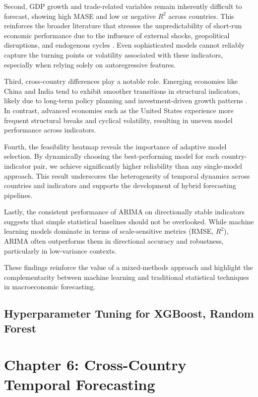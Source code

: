 \documentclass[12pt]{article}
\begin{document}
Second, GDP growth and trade-related variables remain inherently difficult to forecast, showing high MASE and low or negative $R^2$ across countries. This reinforces the broader literature that stresses the unpredictability of short-run economic performance due to the influence of external shocks, geopolitical disruptions, and endogenous cycles \cite{Loungani2001, stock2002structural}. Even sophisticated models cannot reliably capture the turning points or volatility associated with these indicators, especially when relying solely on autoregressive features.

Third, cross-country differences play a notable role. Emerging economies like China and India tend to exhibit smoother transitions in structural indicators, likely due to long-term policy planning and investment-driven growth patterns \cite{zhang2020china, OECD2019india}. In contrast, advanced economies such as the United States experience more frequent structural breaks and cyclical volatility, resulting in uneven model performance across indicators.

Fourth, the feasibility heatmap reveals the importance of adaptive model selection. By dynamically choosing the best-performing model for each country-indicator pair, we achieve significantly higher reliability than any single-model approach. This result underscores the heterogeneity of temporal dynamics across countries and indicators and supports the development of hybrid forecasting pipelines.

Lastly, the consistent performance of ARIMA on directionally stable indicators suggests that simple statistical baselines should not be overlooked. While machine learning models dominate in terms of scale-sensitive metrics (RMSE, $R^2$), ARIMA often outperforms them in directional accuracy and robustness, particularly in low-variance contexts.

These findings reinforce the value of a mixed-methods approach and highlight the complementarity between machine learning and traditional statistical techniques in macroeconomic forecasting.

\subsection{Hyperparameter Tuning for XGBoost, Random Forest}

\section{Chapter 6: Cross-Country Temporal Forecasting}
\end{document}
